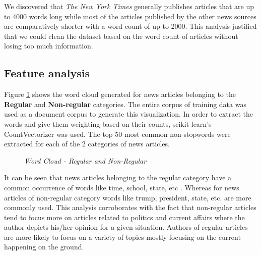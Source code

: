 \documentclass[11pt]{article}
\begin{document}
 
 We discovered that \textit{The New York Times} generally publishes articles that are up to 4000 words long while most of the articles published by the other news sources are comparatively shorter with a word count of up to 2000.
 This analysis justified that we could clean the dataset based on the word count of articles without losing too much information.
\subsection{Feature analysis}

\noindent
Figure \ref{fig:d4} shows the word cloud generated for news articles belonging to the \textbf{Regular} and \textbf{Non-regular} categories. The entire corpus of training data was used as a document corpus to generate this visualization. In order to extract the words and give them weighting based on their counts, scikit-learn's CountVectorizer was used. The top 50 most common non-stopwords were extracted for each of the 2 categories of news articles.


\begin{figure}[!htb]
\caption{\label{fig:d4}  \textit{Word Cloud - Regular and Non-Regular}}
\end{figure}

\noindent
It can be seen that news articles belonging to the regular category have a common occurrence of words like time, school, state, etc . Whereas for news articles of non-regular category words like trump, president, state, etc. are more commonly used.
This analysis corroborates with the fact that non-regular articles tend to focus more on articles related to politics and current affairs where the author depicts his/her opinion for a given situation. Authors of regular articles are more likely to focus on a variety of topics mostly focusing on the current happening on the ground.
\end{document}
